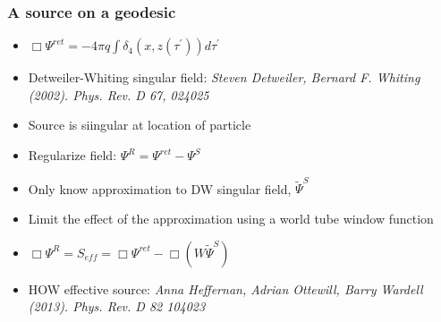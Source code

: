\documentclass{beamer}
\begin{document}
\begin{frame}
  \frametitle{A source on a geodesic}
  \begin{itemize}
    \item$\Box\Psi^{ret}=-4\pi q\int\delta_4(x,z(\tau^\prime))d\tau^\prime$
    \item Detweiler-Whiting singular field: {\em Steven Detweiler, Bernard F. Whiting (2002). Phys. Rev. D 67, 024025}
    \item Source is siingular at location of particle
    \item Regularize field: $\Psi^R=\Psi^{ret}-\Psi^S$
    \item Only know approximation to DW singular field, $\tilde{\Psi}^S$
    \item Limit the effect of the approximation using a world tube window function
  \item $\Box\Psi^R=S_{eff}=\Box\Psi^{ret}-\Box(W\tilde{\Psi}^S)$
  \item HOW effective source: {\em Anna Heffernan, Adrian Ottewill, Barry Wardell (2013). Phys. Rev. D 82 104023}
  \end{itemize}
\end{frame}
\end{document}
